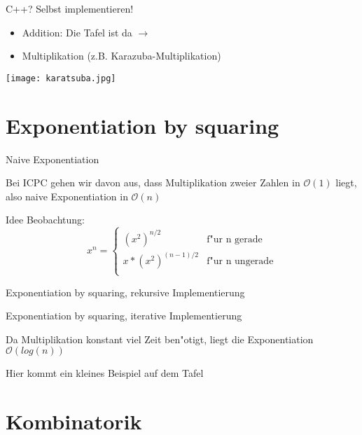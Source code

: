 \documentclass[18pt]{beamer}
\begin{document}
\begin{frame} {C++? Selbst implementieren!}
\begin {itemize}
\item Addition: Die Tafel ist da $\longrightarrow{}$
\item Multiplikation (z.B. Karazuba-Multiplikation)
\end {itemize}
\texttt{[image: karatsuba.jpg]}
\end{frame}

\section {Exponentiation by squaring}
\begin{frame} {Naive Exponentiation} 

Bei ICPC gehen wir davon aus, dass Multiplikation zweier Zahlen in $\mathcal{O}(1)$ liegt, also naive Exponentiation in $\mathcal{O}(n)$
\end{frame}

\begin{frame} {Idee}
Beobachtung:
\begin{equation}
   x^{n} =
   \begin{cases}
     (x^{2})^{n/2} & \text{f"ur n gerade} \\
      x*(x^{2})^{(n-1)/2} & \text{f"ur n ungerade} \\
   \end{cases}
\end{equation}
\end{frame}

\begin{frame} {Exponentiation by squaring, rekursive Implementierung}

\end{frame}

\begin{frame} {Exponentiation by squaring, iterative Implementierung}

Da Multiplikation konstant viel Zeit ben"otigt, liegt die Exponentiation$\mathcal{O}(log(n))$
\end{frame}


\begin{frame}{Hier kommt ein kleines Beispiel auf dem Tafel}
\end{frame}

\section{Kombinatorik}
\end{document}
